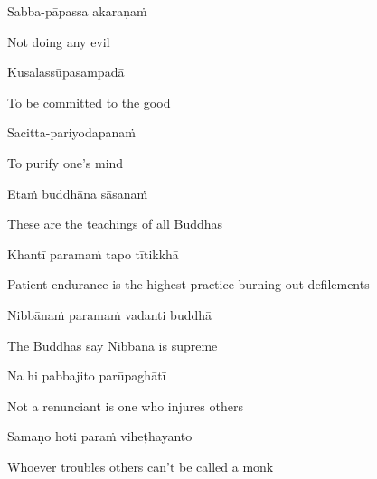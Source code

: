 \vspace{-0.15cm}

Sabba-pāpassa akaraṇaṁ\makeatletter\hyperlink{endnote33-appendix}\makeatother


\begin{english}
  Not doing any evil
\end{english}

Kusalassūpasampadā

\begin{english}
  To be committed to the good
\end{english}

Sacitta-pariyodapanaṁ

\begin{english}
  To purify one's mind
\end{english}

Etaṁ buddhāna sāsanaṁ

\begin{english}
  These are the teachings of all Buddhas
\end{english}

Khantī paramaṁ tapo tītikkhā

\begin{english}
  Patient endurance is the highest practice burning out defilements
\end{english}

Nibbānaṁ paramaṁ vadanti buddhā

\begin{english}
  The Buddhas say Nibbāna is supreme
\end{english}

Na hi pabbajito parūpaghātī

\begin{english}
  Not a renunciant is one who injures others
\end{english}

Samaṇo hoti paraṁ viheṭhayanto

\begin{english}
  Whoever troubles others can't be called a monk
\end{english}

